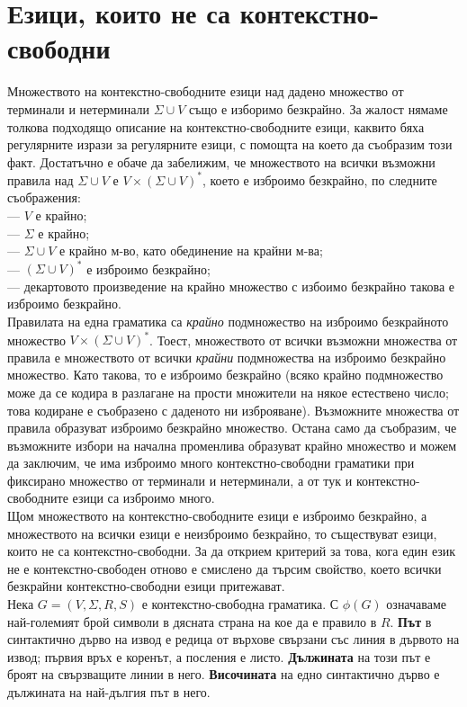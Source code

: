 \documentclass[openany]{book}
\begin{document}
\section{Езици, които не са контекстно-свободни} 
\hspace{15pt} Множеството на контекстно-свободните езици над дадено множество от 
терминали и нетерминали $\Sigma \cup V$ също е изборимо безкрайно.
За жалост нямаме толкова подходящо описание на контекстно-свободните езици, каквито 
бяха регулярните изрази за регулярните езици, с помощта на което да съобразим този факт. Достатъчно е
обаче да забелижим, че множеството на всички възможни правила над $\Sigma \cup V$ е 
$V \times (\Sigma \cup V)^*$, което е изброимо безкрайно, по следните съображения: \\
— $V$ е крайно; \\
— $\Sigma$ е крайно; \\
— $\Sigma \cup V$ е крайно м-во, като обединение на крайни м-ва; \\
— $(\Sigma \cup V)^*$ е изброимо безкрайно; \\
— декартовото произведение на крайно множество с избоимо безкрайно такова е изброимо безкрайно. \\
\hspace{15pt} Правилата на една граматика са \textit{крайно} подмножество на изброимо безкрайното множество 
$V \times (\Sigma \cup V)^*$. Тоест, множеството от всички възможни множества от правила
е множеството от всички \textit{крайни} подмножества на изброимо безкрайно множество. Като такова, 
то е изброимо безкрайно (всяко крайно подмножество може да се кодира в разлагане на 
прости множители на някое естествено число; това кодиране е съобразено с даденото ни
изброяване). Възможните множества от правила образуват изброимо безкрайно множество. 
Остана само да съобразим, че възможните избори на начална променлива образуват крайно
множество и можем да заключим, че има изброимо много контекстно-свободни граматики
при фиксирано множество от терминали и нетерминали, а от тук и контекстно-свободните
езици са изброимо много.\\
\hspace{15pt} Щом множеството на контекстно-свободните езици е изброимо безкрайно, а 
множеството на всички езици е неизброимо безкрайно, то съществуват езици, които не са 
контекстно-свободни. За да открием критерий за това, кога един език не е 
контекстно-свободен отново е смислено да търсим свойство, което всички безкрайни
контекстно-свободни езици притежават. \\
\hspace{15pt} Нека $G = (V,\Sigma,R,S)$ е контекстно-свободна граматика. С $\phi(G)$ означаваме 
най-големият брой символи в дясната страна на кое да е правило в $R$. \textbf{Път} 
в синтактично дърво на извод е редица от върхове свързани със линия в дървото на 
извод; първия връх е коренът, а посления е листо. \textbf{Дължината} на този път е
броят на свързващите линии в него. \textbf{Височината} на едно синтактично дърво е
дължината на най-дългия път в него. \\
\end{document}
